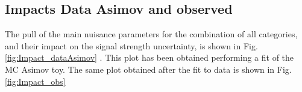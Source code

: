 \newpage
\subsection{Impacts Data Asimov and observed}
The pull of the main nuisance parameters for the combination of all categories, and their impact on the signal strength uncertainty, is shown in Fig. \ref{fig:Impact_dataAsimov} . 
This plot has been obtained performing a fit of the MC Asimov toy. 
The same plot obtained after the fit to data is shown in Fig. \ref{fig:Impact_obs}
\begin{figure}[htb]
\centering
{}
\\


\end{figure}
